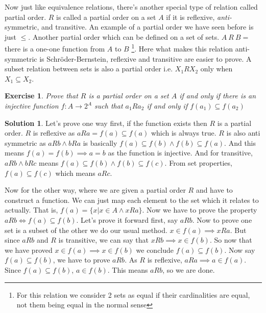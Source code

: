 \documentclass[a4paper,10pt]{article}
\newtheorem{exercise}{Exercise}[section]
\theoremstyle{definition} %
\newtheorem*{solution}{Solution}
\begin{document}
    Now just like equivalence relations, there's another special type of relation
    called partial order. $R$ is called a partial order on a set $A$ if it is reflexive,
    \emph{anti-}symmetric, and transitive. An example of a partial order we have seen 
    before is just $\leq$. Another partial order which can be defined on a set of sets. 
    $A \ R \ B = $ there is a one-one function from $A$ to $B$ \footnote{For this relation
    we consider 2 sets as equal if their cardinalities are equal, not them being equal
    in the normal sense}. Here what makes this relation anti-symmetric is Schr\"{o}der-Bernstein,
    reflexive and transitive are easier to prove. A subset relation between sets is also
    a partial order i.e. $X_1RX_2$ only when $X_1 \subseteq X_2$.

    \begin{exercise}
        Prove that $R$ is a partial order on a set $A$ if and only if there is an injective function $f: 
        A \rightarrow 2^A$ such that $a_1Ra_2$ if and only if  $f(a_1) \subseteq f(a_2)$
    \end{exercise}

    \begin{solution}
        Let's prove one way first, if the function exists then $R$ is a partial order. $R$ is
        reflexive as $aRa = f(a) \subseteq f(a)$ which is always true. $R$ is also anti symmetric
        as $aRb \land bRa$ is basically $f(a) \subseteq f(b) \land f(b) \subseteq f(a)$. And this 
        means $f(a) = f(b) \implies a = b$ as the function is injective. And for transitive, $aRb \land bRc$
        means $f(a) \subseteq f(b) \land f(b) \subseteq f(c)$. From set properties, $f(a) \subseteq f(c)$
        which means $aRc$.

        Now for the other way, where we are given a partial order $R$ and have to construct a function. We can just
        map each element to the set which it relates to actually. That is, $f(a) = \{x| x \in A \land xRa\}$. Now we 
        have to prove the property $aRb \iff f(a) \subseteq f(b)$. Let's prove it forward first, say $aRb$. Now
        to prove one set is a subset of the other we do our usual method. $x \in f(a) \implies xRa$. But since $aRb$
        and $R$ is transitive, we can say that $xRb \implies x \in f(b)$. So now that we have proved $x \in f(a) \implies
        x \in f(b)$ we conclude $f(a) \subseteq f(b)$. Now say $f(a) \subseteq f(b)$, we have to prove $aRb$. As $R$ is 
        reflexive, $aRa \implies a \in f(a)$. Since $f(a) \subseteq f(b)$, $a \in f(b)$. This means $aRb$, so we are done.
    \end{solution}
\end{document}
